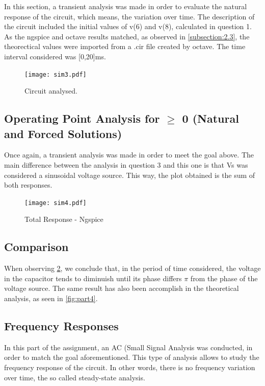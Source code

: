 In this section, a transient analysis was made in order to evaluate the natural response of the circuit, which means, the variation over time. The description of the circuit included the initial values of v(6) and v(8), calculated in question 1. As the ngspice and octave results matched, as observed in \ref{subsection:2.3}, the theorectical values were imported from a .cir file created by octave.
The time interval considered was [0,20]ms.
\begin{figure}[h] \centering
\texttt{[image: sim3.pdf]}
\caption{Circuit analysed.}
\label{fig:sim3}
\end{figure}
\newpage


\subsection{Operating Point Analysis for $\ge$ 0 (Natural and Forced Solutions)}

Once again, a transient analysis was made in order to meet the goal above. The main difference between the analysis in question 3 and this one is that Vs was considered a sinusoidal voltage source. This way, the plot obtained is the sum of both responses.

\begin{figure}[h] \centering
\texttt{[image: sim4.pdf]}
\caption{Total Response - Ngspice}
\label{fig:sim4}
\end{figure}

\subsection{Comparison}
 When observing \ref{fig:sim4}, we conclude that, in the period of time considered, the voltage in the capacitor tends to diminuish until its phase differs $\pi$ from the phase of the voltage source. The same result has also been accomplish in the theoretical analysis, as seen in \ref{fig:part4}.

\newpage


\subsection{Frequency Responses}



In this part of the assignment, an AC (Small Signal Analysis was conducted, in order to match the goal aforementioned. This type of analysis allows to study the frequency response of the circuit. In other words, there is no frequency variation over time, the so called steady-state analysis.



